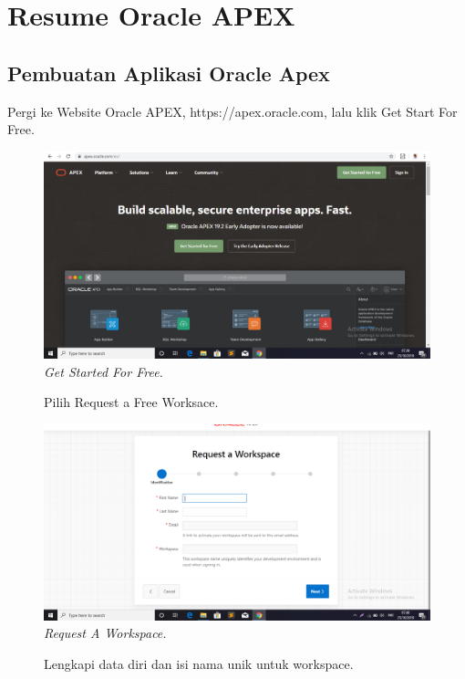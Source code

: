 \chapter{Resume Oracle APEX}
\section{Pembuatan Aplikasi Oracle Apex}
\begin{enumerate}

\item[1]Pergi ke Website Oracle APEX, https://apex.oracle.com, lalu klik Get Start For Free.

\begin{figure}[!htbp]
    \begin{center}
    \includegraphics[scale=0.2]{apex/apex1.png}
    \caption{\textit{Get Started For Free.}}
    \end{center}   
    \end{figure}
    
\begin{figure}[!htbp]
\item[2]Pilih Request a Free Worksace.

    \begin{center}
    \includegraphics[scale=0.2]{apex/apex2.png}
    \caption{\textit{Request A Workspace.}}
    \end{center}
    \end{figure}
\begin{figure}
\item[3]Lengkapi data diri dan isi nama unik  untuk workspace.


\end{figure}
\end{enumerate}
